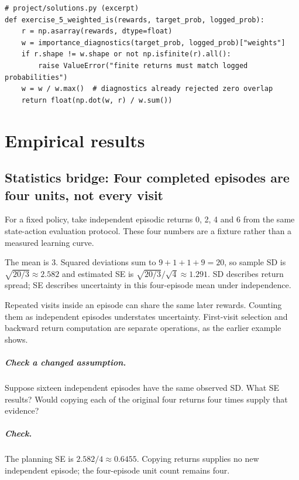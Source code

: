 \documentclass[11pt,oneside]{scrbook}
\begin{document}
\begin{codebox}
\begin{verbatim}
# project/solutions.py (excerpt)
def exercise_5_weighted_is(rewards, target_prob, logged_prob):
    r = np.asarray(rewards, dtype=float)
    w = importance_diagnostics(target_prob, logged_prob)["weights"]
    if r.shape != w.shape or not np.isfinite(r).all():
        raise ValueError("finite returns must match logged probabilities")
    w = w / w.max()  # diagnostics already rejected zero overlap
    return float(np.dot(w, r) / w.sum())
\end{verbatim}
\end{codebox}

\chapter{Empirical results}

\section{Statistics bridge: Four completed episodes are four units, not every visit}
\begin{example}
For a fixed policy, take independent episodic returns 0, 2, 4 and 6 from the same state-action evaluation protocol. These four numbers are a fixture rather than a measured learning curve.

The mean is 3. Squared deviations sum to $9+1+1+9=20$, so sample SD is $\sqrt{20/3}\approx2.582$ and estimated SE is $\sqrt{20/3}/\sqrt4\approx1.291$. SD describes return spread; SE describes uncertainty in this four-episode mean under independence.
\end{example}
Repeated visits inside an episode can share the same later rewards. Counting them as independent episodes understates uncertainty. First-visit selection and backward return computation are separate operations, as the earlier example shows.

\paragraph{Check a changed assumption.} Suppose sixteen independent episodes have the same observed SD. What SE results? Would copying each of the original four returns four times supply that evidence?
\paragraph{Check.} The planning SE is $2.582/4\approx0.6455$. Copying returns supplies no new independent episode; the four-episode unit count remains four.
\end{document}
